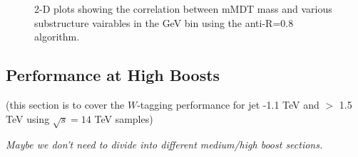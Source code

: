 \begin{figure}
\begin{center}
\caption{2-D plots showing the correlation between mMDT mass and
  various substructure vairables in the  GeV bin using the anti-\kT R=0.8 algorithm.}
\label{fig:pt500_2d_mmdt_AKt_R08}
\end{center}
\end{figure}



\subsection{Performance at High Boosts}

(this section is to cover the $W$-tagging performance for jet -1.1 TeV and
$>$ 1.5 TeV using $\sqrt{s} = 14$ TeV samples)

{\it Maybe we don't need to divide into different medium/high boost sections.}




